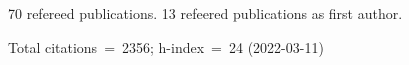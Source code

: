 70 refereed publications. 13 refeered publications as first author.

Total citations~=~2356; h-index~=~24 (2022-03-11)